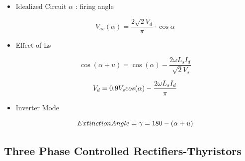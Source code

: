 \documentclass[twocolumn, ]{article}
\begin{document}
\begin{itemize}
\item {Idealized Circuit} $\alpha$ : firing angle

\begin{equation*}
	V_{av}(\alpha)=\frac{2 \sqrt{2} V_{d}}{\pi } \cdot \cos{\alpha}
\end{equation*}

\item {Effect of Ls}

\begin{equation*}
	\cos(\alpha + u)=\cos(\alpha)-\dfrac{2\omega L_{s} I_{d}}{\sqrt[]{2}V_{s}}
\end{equation*}

\begin{equation*}
	V_d = 0.9 V_s cos(\alpha) - \dfrac{2\omega L_s I_d}{\pi} \\
\end{equation*}

\item {Inverter Mode}

\begin{equation*}
	Extinction Angle = \\\gamma = 180 - (\alpha + u)\\
\end{equation*}


\end{itemize}

\subsection*{\small Three Phase Controlled Rectifiers-Thyristors}
\end{document}
